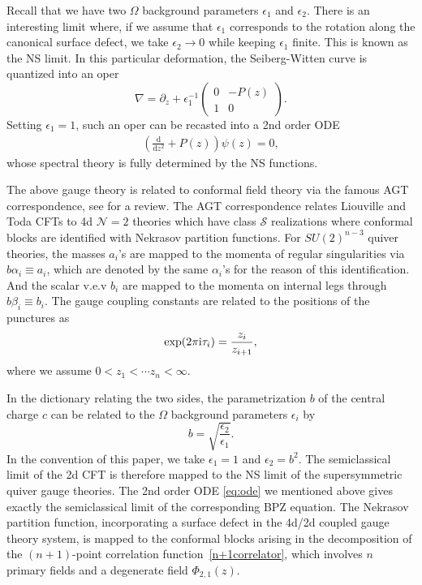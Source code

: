 \documentclass[11pt]{article}
\numberwithin{equation}{section}
\newcommand{\ri}{{\rm i}}
\begin{document}
Recall that we have two $\Omega$ background parameters $\epsilon_1$ and $\epsilon_2$. There is an interesting limit where, if we assume that $\epsilon_1$ corresponds to the rotation along the canonical surface defect,  we take $\epsilon_2\rightarrow 0$ while keeping $\epsilon_1$ finite. This is known as the NS limit. In this particular deformation, the Seiberg-Witten curve is quantized into an oper
\begin{equation}
    \nabla=\partial_z+\epsilon_1^{-1}
\begin{pmatrix} 0 & -P(z)\\ 1 & 0\end{pmatrix}.\end{equation}
Setting $\epsilon_1=1$, such an oper can be recasted into a 2nd order ODE 
\begin{equation}\label{eq:ode}
\begin{aligned}
\left(\frac{\mathrm{d}}{\mathrm{d}z^2}+P(z)\right)\psi(z)=0,
\end{aligned}
\end{equation}
whose spectral theory is fully determined by the NS functions.



The above gauge theory is related to conformal field theory via the famous AGT correspondence, see \cite{LeFloch:2020uop} for a review. The AGT correspondence relates  Liouville and Toda CFTs to  4d $\mathcal{N}=2$ theories which have class $\mathcal{S}$ realizations \cite{Alday:2009aq, Alday:2009fs,Wyllard:2009hg} where conformal blocks are identified with Nekrasov partition functions. For $SU(2)^{n-3}$ quiver theories, the masses $a_i$'s are mapped to the momenta of regular singularities via $b\alpha_i\equiv a_i$, which are denoted by the same $\alpha_i$'s for the reason of this identification. And the scalar v.e.v $b_i$ are mapped to the momenta on internal legs through $b\beta_i\equiv b_i$. The gauge coupling constants are related to the positions of the punctures as
\begin{equation}
 \exp(2\pi\ri\tau_i)=\frac{z_i}{z_{i+1}} ,\end{equation}
where we assume $0<z_1<\cdots z_n<\infty$. 

In the dictionary relating the two sides, the parametrization $b$ of the central charge $c$ can be related to the $\Omega$ background parameters $\epsilon_i$ by
\begin{equation}
b=\sqrt{\frac{\epsilon_2}{\epsilon_1}}.
\end{equation}
In the convention of this paper, we take $\epsilon_1=1$ and $\epsilon_2=b^2$. The semiclassical limit of the 2d CFT is therefore mapped to the NS limit of the supersymmetric quiver gauge theories. The 2nd order ODE \eqref{eq:ode} we mentioned above gives exactly the semiclassical limit of the corresponding BPZ equation. The Nekrasov partition function, incorporating a surface defect in the 4d/2d coupled gauge theory system, is mapped to the conformal blocks arising in the decomposition of the $(n+1)$-point correlation function~\eqref{n+1correlator}, which involves \( n \) primary fields and a degenerate field \( \Phi_{2,1}(z) \).
\end{document}
